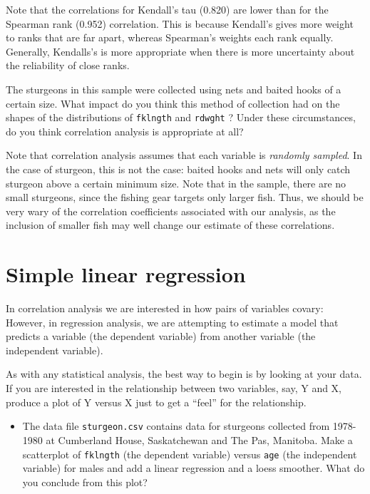 \documentclass[
  12pt,
]{book}
\providecommand{\tightlist}{%
  \setlength{\itemsep}{0pt}\setlength{\parskip}{0pt}}
\begin{document}
Note that the correlations for Kendall's tau (0.820) are lower than for the Spearman rank (0.952) correlation. This is because Kendall's gives more weight to ranks that are far apart, whereas Spearman's weights each rank equally. Generally, Kendalls's is more appropriate when there is more uncertainty about the reliability of close ranks.

The sturgeons in this sample were collected using nets and baited hooks of a certain size. What impact do you think this method of collection had on the shapes of the distributions of \texttt{fklngth} and \texttt{rdwght} ? Under these circumstances, do you think correlation analysis is appropriate at all?

Note that correlation analysis assumes that each variable is \emph{randomly sampled}. In the case of sturgeon, this is not the case: baited hooks and nets will only catch sturgeon above a certain minimum size. Note that in the sample, there are no small sturgeons, since the fishing gear targets only larger fish. Thus, we should be very wary of the correlation coefficients associated with our analysis, as the inclusion of smaller fish may well change our estimate of these correlations.

\hypertarget{simple-linear-regression}{%
\section{Simple linear regression}\label{simple-linear-regression}}

In correlation analysis we are interested in how pairs of variables covary: However, in regression analysis, we are attempting to estimate a model that predicts a variable (the dependent variable) from another variable (the independent variable).

As with any statistical analysis, the best way to begin is by looking at your data.
If you are interested in the relationship between two variables, say, Y and X, produce a plot of Y versus X just to get a ``feel'' for the relationship.

\begin{itemize}
\tightlist
\item
  The data file \texttt{sturgeon.csv} contains data for sturgeons collected from 1978-1980 at Cumberland House, Saskatchewan and The Pas, Manitoba. Make a scatterplot of \texttt{fklngth} (the dependent variable) versus \texttt{age} (the independent variable) for males and add a linear regression and a loess smoother. What do you conclude from this plot?
\end{itemize}
\end{document}
